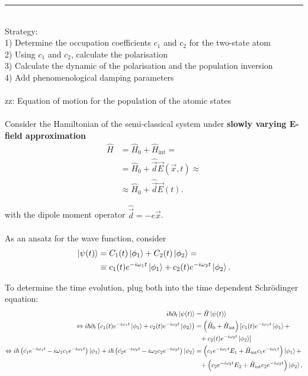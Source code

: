 \documentclass{article}
\newcommand{\lr}[1]{\left(#1\right)}
\begin{document}
{\color{violet}
\hrule
	\\
	Strategy:\\
	1) Determine the occupation coefficients $c_1$ and $c_2$ for the two-state atom\\
	2) Using $c_1$ and $c_2$, calculate the polarisation \\
	3) Calculate the dynamic of the polarisation and the population inversion \\
	4) Add phenomenological damping parameters \\
	\\
	zz: Equation of motion for the population of the atomic states \\
	\\
	Consider the Hamiltonian of the semi-classical system under \textbf{slowly varying E-field approximation}
		\begin{align*}
			\hat{H} &= \hat{H}_0 + \hat{H}_\text{int} = \\
			&= \hat{H}_0 + \hat{\vec{d}}\vec{E}(\vec{x}, t) \approx \\
			&\approx \hat{H}_0 + \hat{\vec{d}}\vec{E}(t).
		\end{align*}
	
	with the dipole moment operator $\hat{\vec{d}} = -e\vec{x}$.\\
	\\
	As an ansatz for the wave function, consider
		\begin{align*}
			\ket{\psi(t)} &= C_1(t) \ket{\phi_1} + C_2(t) \ket{\phi_2} = \\
			&\equiv c_1(t) e^{-i\omega_1 t} \ket{\phi_1} + c_2(t) e^{-i\omega_2 t} \ket{\phi_2}.
		\end{align*}
	
	To determine the time evolution, plug both into the time dependent Schrödinger equation:
		\begin{align*}
			i\hbar \partial_t \ket{\psi(t)} &= \hat{H} \ket{\psi(t)} \\
			\Leftrightarrow i\hbar \partial_t \lr{ c_1(t) e^{-i\omega_1 t} \ket{\phi_1} + c_2(t) e^{-i\omega_2 t} \ket{\phi_2} } &= \lr{ \hat{H}_0 + \hat{H}_\text{int} } [ c_1(t) e^{-i\omega_1 t} \ket{\phi_1} + \\
			&\phantom{=}+ c_2(t) e^{-i\omega_2 t} \ket{\phi_2} ] \\
			\Leftrightarrow i\hbar \lr{ \dot{c_1} e^{-i\omega_1 t} - i\omega_1 c_1 e^{-i\omega_1 t} } \ket{\phi_1} + i\hbar \lr{ \dot{c_2} e^{-i\omega_2 t} - i\omega_2 c_2 e^{-i\omega_2 t} } \ket{\phi_2} &= \lr{ c_1 e^{-i\omega_1 t} E_1 + \hat{H}_\text{int} c_1 e^{-i\omega_1 t} } \ket{\phi_1} + \\
			&\phantom{=} + \lr{ c_2 e^{-i\omega_2 t} E_2 + \hat{H}_\text{int} c_2 e^{-i\omega_2 t} } \ket{\phi_2},
		\end{align*}

}
\end{document}
